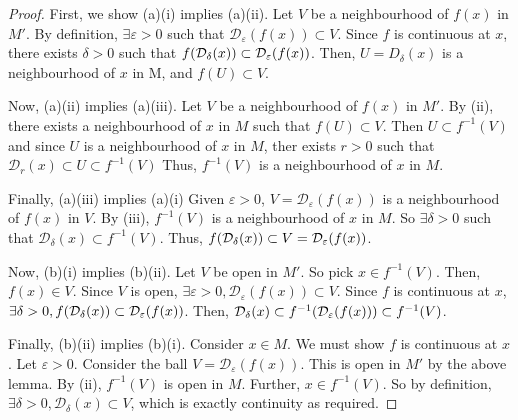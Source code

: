\begin{proof}
	First, we show (a)(i) implies (a)(ii).
	Let \( V \) be a neighbourhood of \( f(x) \) in \( M' \).
	By definition, \( \exists \varepsilon > 0 \) such that \( \mathcal D_\varepsilon(f(x)) \subset V \).
	Since \( f \) is continuous at \( x \), there exists \( \delta > 0 \) such that \( f\qty(\mathcal D_\delta(x)) \subset \mathcal D_\varepsilon(f(x)) \).
	Then, \( U = D_\delta(x) \) is a neighbourhood of \( x \) in M, and \( f(U) \subset V \).

	Now, (a)(ii) implies (a)(iii).
	Let \( V \) be a neighbourhood of \( f(x) \) in \( M' \).
	By (ii), there exists a neighbourhood of \( x \) in \( M \) such that \( f(U) \subset V \).
	Then \( U \subset f^{-1}(V) \) and since \( U \) is a neighbourhood of \( x \) in \( M \), ther exists \( r > 0 \) such that \( \mathcal D_r(x) \subset U \subset f^{-1}(V) \)
	Thus, \( f^{-1}(V) \) is a neighbourhood of \( x \) in \( M \).

	Finally, (a)(iii) implies (a)(i)
	Given \( \varepsilon > 0 \), \( V = \mathcal D_\varepsilon(f(x)) \) is a neighbourhood of \( f(x) \) in \( V \).
	By (iii), \( f^{-1}(V) \) is a neighbourhood of \( x \) in \( M \).
	So \( \exists \delta > 0 \) such that \( \mathcal D_\delta(x) \subset f^{-1}(V) \).
	Thus, \( f\qty(\mathcal D_\delta(x)) \subset V = \mathcal D_\varepsilon(f(x)) \).

	Now, (b)(i) implies (b)(ii).
	Let \( V \) be open in \( M' \).
	So pick \( x \in f^{-1}(V) \).
	Then, \( f(x) \in V \).
	Since \( V \) is open, \( \exists \varepsilon > 0, \mathcal D_\varepsilon(f(x)) \subset V \).
	Since \( f \) is continuous at \( x \), \( \exists \delta > 0, f\qty(\mathcal D_\delta(x)) \subset \mathcal D_\varepsilon(f(x)) \).
	Then, \( \mathcal D_\delta(x) \subset f^{-1}\qty(\mathcal D_\varepsilon(f(x))) \subset f^{-1}(V) \).

	Finally, (b)(ii) implies (b)(i).
	Consider \( x \in M \).
	We must show \( f \) is continuous at \( x \).
	Let \( \varepsilon > 0 \).
	Consider the ball \( V = \mathcal D_\varepsilon(f(x)) \).
	This is open in \( M' \) by the above lemma.
	By (ii), \( f^{-1}(V) \) is open in \( M \).
	Further, \( x \in f^{-1}(V) \).
	So by definition, \( \exists \delta > 0, \mathcal D_\delta(x) \subset V \), which is exactly continuity as required.
\end{proof}

